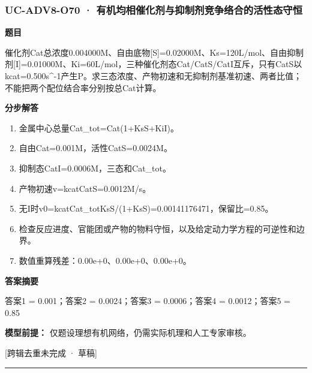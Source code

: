 \documentclass[UTF8,11pt,a4paper]{ctexart}
\begin{document}
\subsubsection*{UC-ADV8-O70 · 有机均相催化剂与抑制剂竞争络合的活性态守恒}
\noindent\textbf{题目}\par
催化剂Cat总浓度0.004000M、自由底物[S]=0.02000M、Ks=120L/mol、自由抑制剂[I]=0.01000M、Ki=60L/mol，三种催化剂态Cat/CatS/CatI互斥，只有CatS以kcat=0.500s\textasciicircum{}-1产生P。求三态浓度、产物初速和无抑制剂基准初速、两者比值；不能把两个配位结合率分别按总Cat计算。\par
\medskip\noindent\textbf{分步解答}
\begin{enumerate}
\item 金属中心总量Cat\_tot=Cat(1+KsS+KiI)。
\item 自由Cat=0.001M，活性CatS=0.0024M。
\item 抑制态CatI=0.0006M，三态和Cat\_tot。
\item 产物初速v=kcatCatS=0.0012M/s。
\item 无I时v0=kcatCat\_totKsS/(1+KsS)=0.00141176471，保留比=0.85。
\item 检查反应进度、官能团或产物的物料守恒，以及给定动力学方程的可逆性和边界。
\item 数值重算残差：0.00e+0、0.00e+0、0.00e+0。
\end{enumerate}
\noindent\textbf{答案摘要}\par
答案1 = 0.001；答案2 = 0.0024；答案3 = 0.0006；答案4 = 0.0012；答案5 = 0.85\par
\noindent\textbf{模型前提：}
仅题设理想有机网络，仍需实际机理和人工专家审核。\par
\noindent\textcolor{red!65!black}{[跨辑去重未完成 · 草稿]} \par
\medskip\hrule\medskip
{}
\end{document}
